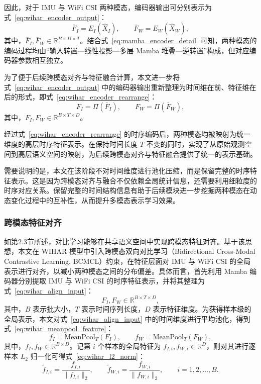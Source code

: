 因此，对于 IMU 与 WiFi CSI 两种模态，编码器输出可分别表示为式~\eqref{eq:wihar_encoder_output}：
\begin{equation}
\bar{F}_I = E_I(\hat{X}_I), \qquad
\bar{F}_W = E_W(\hat{X}_W),
\label{eq:wihar_encoder_output}
\end{equation}
其中，$\bar{F}_I,\bar{F}_W \in \mathbb{R}^{B \times D \times T}$。结合式~\eqref{eq:mamba_encoder_detail} 可知，两种模态的编码过程均由“输入转置—线性投影—多层 Mamba 堆叠—逆转置”构成，但对应编码器参数相互独立。

为了便于后续跨模态对齐与特征融合计算，本文进一步将式~\eqref{eq:wihar_encoder_output} 中的编码器输出重新整理为时间维在前、特征维在后的形式，即式~\eqref{eq:wihar_encoder_rearrange}：
\begin{equation}
F_I = \Pi(\bar{F}_I), \qquad
F_W = \Pi(\bar{F}_W),
\label{eq:wihar_encoder_rearrange}
\end{equation}
其中，$F_I, F_W \in \mathbb{R}^{B \times T \times D}$。

经过式~\eqref{eq:wihar_encoder_rearrange} 的时序编码后，两种模态均被映射为统一维度的高层时序特征表示。在保持时间长度 $T$ 不变的同时，实现了从原始观测空间到高层语义空间的映射，为后续跨模态对齐与特征融合提供了统一的表示基础。

需要说明的是，本文在该阶段不对时间维度进行池化压缩，而是保留完整的时序特征表示。这是因为跨模态对齐与融合不仅依赖全局统计信息，还需要利用细粒度的时序对应关系。保留完整的时间结构信息有助于后续模块进一步挖掘两种模态在动态变化过程中的互补性，从而提升多模态表示学习效果。

\subsubsection{跨模态特征对齐}{}

如第2.3节所述，对比学习能够在共享语义空间中实现跨模态特征对齐。基于该思想，本文在 WIHAR 模型中引入跨模态双向对比学习（Bidirectional Cross-Modal Contrastive Learning, BCMCL）约束，在特征层面对 IMU 与 WiFi CSI 的全局表示进行对齐，以减小两种模态之间的分布偏差。具体而言，首先利用 Mamba 编码器分别提取 IMU 与 WiFi CSI 的时序特征表示，并将其整理为式~\eqref{eq:wihar_align_input}：
\begin{equation}
F_I, F_W \in \mathbb{R}^{B \times T \times D},
\label{eq:wihar_align_input}
\end{equation}
其中，$B$ 表示批大小，$T$ 表示时间序列长度，$D$ 表示特征维度。为获得样本级的全局表示，本文对式~\eqref{eq:wihar_align_input} 中的时间维度进行平均池化，得到式~\eqref{eq:wihar_meanpool_feature}：
\begin{equation}
f_I = \mathrm{MeanPool}_T(F_I), \qquad
f_W = \mathrm{MeanPool}_T(F_W),
\label{eq:wihar_meanpool_feature}
\end{equation}
其中，$f_I, f_W \in \mathbb{R}^{B \times D}$。记第 $i$ 个样本的全局特征为 $f_{I,i}, f_{W,i} \in \mathbb{R}^{D}$，则对其进行逐样本 $L_2$ 归一化可得式~\eqref{eq:wihar_l2_norm}：
\begin{equation}
\tilde{f}_{I,i} = \frac{f_{I,i}}{\|f_{I,i}\|_2}, \qquad
\tilde{f}_{W,i} = \frac{f_{W,i}}{\|f_{W,i}\|_2},
\qquad i=1,2,\dots,B.
\label{eq:wihar_l2_norm}
\end{equation}


